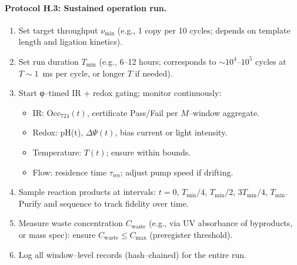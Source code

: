 \documentclass[11pt]{article}
\begin{document}
\paragraph{Protocol H.3: Sustained operation run.}
\begin{enumerate}
\item Set target throughput $\nu_{\min}$ (e.g., 1 copy per 10 cycles; depends on template length and ligation kinetics).
\item Set run duration $T_{\min}$ (e.g., 6–12 hours; corresponds to $\sim 10^4$–$10^5$ cycles at $T\sim 1$~ms per cycle, or longer $T$ if needed).
\item Start φ–timed IR + redox gating; monitor continuously:
\begin{itemize}
\item IR: $\mathrm{Occ}_{724}(t)$, certificate \textsf{Pass/Fail} per $M$–window aggregate.
\item Redox: pH(t), $\Delta\Psi(t)$, bias current or light intensity.
\item Temperature: $T(t)$; ensure within bounds.
\item Flow: residence time $\tau_{\mathrm{res}}$; adjust pump speed if drifting.
\end{itemize}
\item Sample reaction products at intervals: $t=0$, $T_{\min}/4$, $T_{\min}/2$, $3T_{\min}/4$, $T_{\min}$. Purify and sequence to track fidelity over time.
\item Measure waste concentration $C_{\mathrm{waste}}$ (e.g., via UV absorbance of byproducts, or mass spec): ensure $C_{\mathrm{waste}}\le C_{\max}$ (preregister threshold).
\item Log all window–level records (hash–chained) for the entire run.
\end{enumerate}
\end{document}
